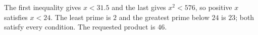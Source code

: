 The first inequality gives $x<31.5$ and the last gives $x^2<576$, so positive $x$ satisfies $x<24$. The least prime is $2$ and the greatest prime below $24$ is $23$; both satisfy every condition. The requested product is $\boxed{46}$.
